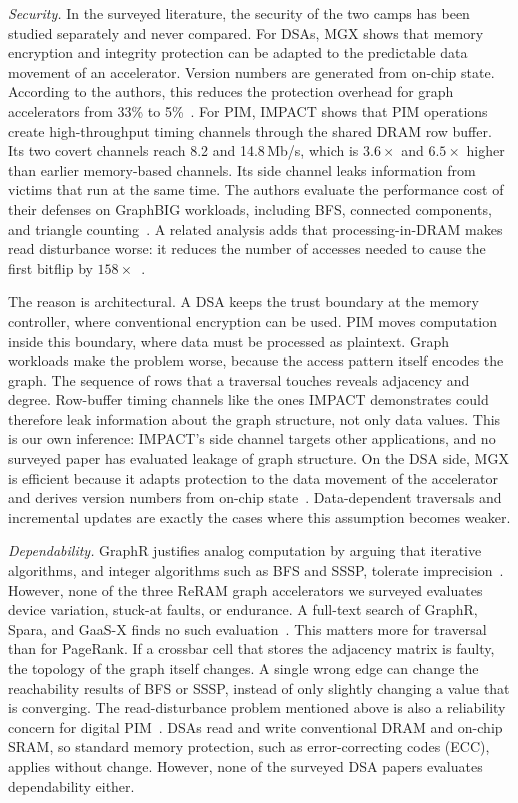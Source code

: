 \documentclass[journal,onecolumn]{IEEEtran}
\begin{document}
\emph{Security.} In the surveyed literature, the security of the two camps has been studied separately and never compared. For DSAs, MGX shows that memory encryption and integrity protection can be adapted to the predictable data movement of an accelerator. Version numbers are generated from on-chip state. According to the authors, this reduces the protection overhead for graph accelerators from 33\% to 5\%~\cite{hua2022mgx}. For PIM, IMPACT shows that PIM operations create high-throughput timing channels through the shared DRAM row buffer. Its two covert channels reach 8.2 and 14.8\,Mb/s, which is $3.6\times$ and $6.5\times$ higher than earlier memory-based channels. Its side channel leaks information from victims that run at the same time. The authors evaluate the performance cost of their defenses on GraphBIG workloads, including BFS, connected components, and triangle counting~\cite{bostanci2025impact}. A related analysis adds that processing-in-DRAM makes read disturbance worse: it reduces the number of accesses needed to cause the first bitflip by $158\times$~\cite{yuksel2026pid}.

The reason is architectural. A DSA keeps the trust boundary at the memory controller, where conventional encryption can be used. PIM moves computation inside this boundary, where data must be processed as plaintext. Graph workloads make the problem worse, because the access pattern itself encodes the graph. The sequence of rows that a traversal touches reveals adjacency and degree. Row-buffer timing channels like the ones IMPACT demonstrates could therefore leak information about the graph structure, not only data values. This is our own inference: IMPACT's side channel targets other applications, and no surveyed paper has evaluated leakage of graph structure. On the DSA side, MGX is efficient because it adapts protection to the data movement of the accelerator and derives version numbers from on-chip state~\cite{hua2022mgx}. Data-dependent traversals and incremental updates are exactly the cases where this assumption becomes weaker.

\emph{Dependability.} GraphR justifies analog computation by arguing that iterative algorithms, and integer algorithms such as BFS and SSSP, tolerate imprecision~\cite{song2018graphr}. However, none of the three ReRAM graph accelerators we surveyed evaluates device variation, stuck-at faults, or endurance. A full-text search of GraphR, Spara, and GaaS-X finds no such evaluation~\cite{song2018graphr,zheng2020spara,challapalle2020gaasx}. This matters more for traversal than for PageRank. If a crossbar cell that stores the adjacency matrix is faulty, the topology of the graph itself changes. A single wrong edge can change the reachability results of BFS or SSSP, instead of only slightly changing a value that is converging. The read-disturbance problem mentioned above is also a reliability concern for digital PIM~\cite{yuksel2026pid}. DSAs read and write conventional DRAM and on-chip SRAM, so standard memory protection, such as error-correcting codes (ECC), applies without change. However, none of the surveyed DSA papers evaluates dependability either.
\end{document}
